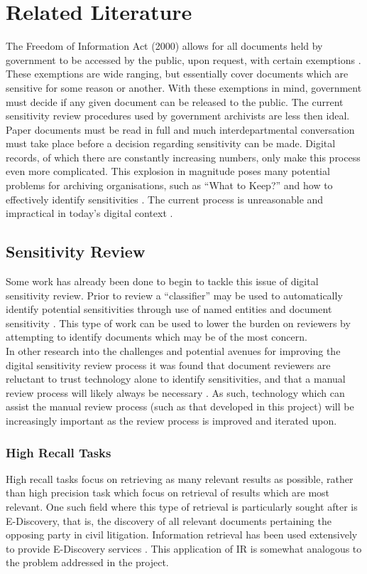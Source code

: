\documentclass{l4proj}
\begin{document}
\chapter{Related Literature} \label{relatedliterature}
The Freedom of Information Act (2000) allows for all documents held by government to be accessed by the public, upon request, with certain exemptions \cite{foi}. These exemptions are wide ranging, but essentially cover documents which are sensitive for some reason or another. With these exemptions in mind, government must decide if any given document can be released to the public.
The current sensitivity review procedures used by government archivists are less then ideal. Paper documents must be read in full and much interdepartmental conversation must take place before a decision regarding sensitivity can be made. Digital records, of which there are constantly increasing numbers, only make this process even more complicated. This explosion in magnitude poses many potential problems for archiving organisations, such as ``What to Keep?'' and how to effectively identify sensitivities \cite{moss2012have}. The current process is unreasonable and impractical in today's digital context \cite{allan2014record}.

\section{Sensitivity Review}
Some work has already been done to begin to tackle this issue of digital sensitivity review. Prior to review a ``classifier'' may be used to automatically identify potential sensitivities through use of named entities and document sensitivity \cite{mcdonald2014towards}. This type of work can be used to lower the burden on reviewers by attempting to identify documents which may be of the most concern. \\
In other research into the challenges and potential avenues for improving the digital sensitivity review process it was found that document reviewers are reluctant to trust technology alone to identify sensitivities, and that a manual review process will likely always be necessary \cite{gollins2014using}. 
As such, technology which can assist the manual review process (such as that developed in this project) will be increasingly important as the review process is improved and iterated upon.

\subsection{High Recall Tasks}
High recall tasks focus on retrieving as many relevant results as possible, rather than high precision task which focus on retrieval of results which are most relevant.
One such field where this type of retrieval is particularly sought after is E-Discovery, that is, the discovery of all relevant documents pertaining the opposing party in civil litigation. Information retrieval has been used extensively to provide E-Discovery services \cite{oard2013information}. This application of IR is somewhat analogous to the problem addressed in the project.
\end{document}
